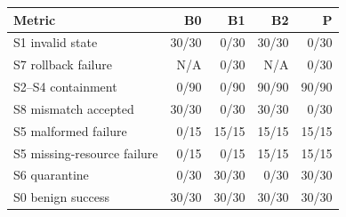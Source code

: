 \begin{tabular}{lrrrr}
\toprule
Metric & B0 & B1 & B2 & P \\
\midrule
S1 invalid state & 30/30 & 0/30 & 30/30 & 0/30 \\
S7 rollback failure & N/A & 0/30 & N/A & 0/30 \\
S2--S4 containment & 0/90 & 0/90 & 90/90 & 90/90 \\
S8 mismatch accepted & 30/30 & 0/30 & 30/30 & 0/30 \\
S5 malformed failure & 0/15 & 15/15 & 15/15 & 15/15 \\
S5 missing-resource failure & 0/15 & 0/15 & 15/15 & 15/15 \\
S6 quarantine & 0/30 & 30/30 & 0/30 & 30/30 \\
S0 benign success & 30/30 & 30/30 & 30/30 & 30/30 \\
\bottomrule
\end{tabular}
